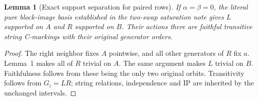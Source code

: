 \documentclass[11pt,a4paper]{article}
\newtheorem{lemma}{Lemma}
\begin{document}
\begin{lemma}[Exact support separation for paired rows]
If $\alpha=\beta=0$, the literal pure block-image basis established
in the two-swap saturation note gives $L$ supported on $A$ and
$R$ supported on $B$. Their actions there are faithful transitive
string C-markings with their original generator orders.
\end{lemma}
\begin{proof}
The right neighbor fixes $A$ pointwise, and all other generators
of $R$ fix $a$. Lemma~1 makes all of $R$ trivial on $A$.
The same argument makes $L$ trivial on $B$.
Faithfulness follows from these being the only two original
orbits. Transitivity follows from $G_i=LR$; string relations,
independence and IP are inherited by the unchanged intervals.
\end{proof}
\end{document}
